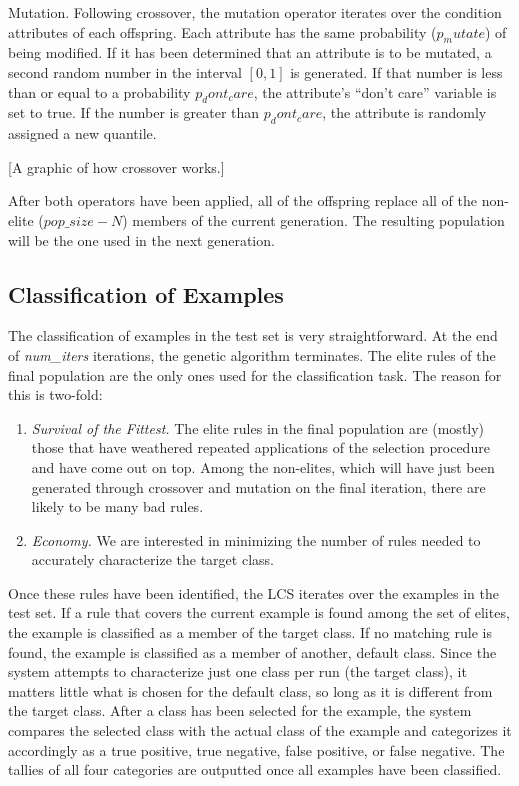 \documentclass[11pt]{article}
\begin{document}
Mutation. Following crossover, the mutation operator iterates over the condition attributes of each offspring. Each attribute has the same probability ($p_mutate$) of being modified. If it has been determined that an attribute is to be mutated, a second random number in the interval $[0,1]$ is generated. If that number is less than or equal to a probability $p_dont_care$, the attribute’s ``don’t care'' variable is set to true. If the number is greater than $p_dont_care$, the attribute is randomly assigned a new quantile.

[A graphic of how crossover works.]

After both operators have been applied, all of the offspring replace all of the non-elite ($pop\_size - N$) members of the current generation. The resulting population will be the one used in the next generation.

\subsection{Classification of Examples}

The classification of examples in the test set is very straightforward. At the end of \textit{num\_iters} iterations, the genetic algorithm terminates. The elite rules of the final population are the only ones used for the classification task. The reason for this is two-fold:
\begin{enumerate}
\item \textit{Survival of the Fittest.} The elite rules in the final population are (mostly) those that have weathered repeated applications of the selection procedure and have come out on top. Among the non-elites, which will have just been generated through crossover and mutation on the final iteration, there are likely to be many bad rules.
\item \textit{Economy.} We are interested in minimizing the number of rules needed to accurately characterize the target class.
\end{enumerate}

Once these rules have been identified, the LCS iterates over the examples in the test set. If a rule that covers the current example is found among the set of elites, the example is classified as a member of the target class. If no matching rule is found, the example is classified as a member of another, default class. Since the system attempts to characterize just one class per run (the target class), it matters little what is chosen for the default class, so long as it is different from the target class. After a class has been selected for the example, the system compares the selected class with the actual class of the example and categorizes it accordingly as a true positive, true negative, false positive, or false negative. The tallies of all four categories are outputted once all examples have been classified.
\end{document}
